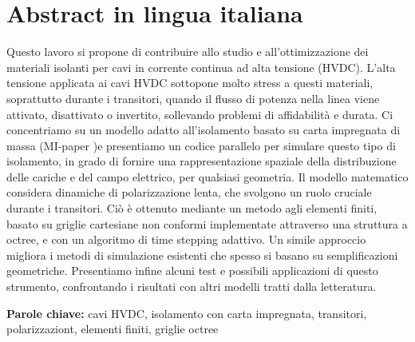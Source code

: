 \documentclass[11pt,a4paper]{article}
\begin{document}
\section*{Abstract in lingua italiana}
Questo lavoro si propone di contribuire allo studio e all'ottimizzazione dei materiali isolanti per cavi in corrente continua ad alta tensione (HVDC). L'alta tensione applicata ai cavi HVDC sottopone molto stress a questi materiali, soprattutto durante i transitori, quando il flusso di potenza nella linea viene attivato, disattivato o invertito, sollevando problemi di affidabilità e durata. Ci concentriamo su un modello adatto all'isolamento basato su carta impregnata di massa (MI-paper )e presentiamo un codice parallelo per simulare questo tipo di isolamento, in grado di fornire una rappresentazione spaziale della distribuzione delle cariche e del campo elettrico, per qualsiasi geometria. Il modello matematico considera dinamiche di polarizzazione lenta, che svolgono un ruolo cruciale durante i transitori. Ciò è ottenuto mediante un metodo agli elementi finiti, basato su griglie cartesiane non conformi implementate attraverso una struttura a octree, e con un algoritmo di time stepping adattivo. Un simile approccio migliora i metodi di simulazione esistenti che spesso si basano su semplificazioni geometriche. Presentiamo infine alcuni test e possibili applicazioni di questo strumento, confrontando i risultati con altri modelli tratti dalla letteratura.
\vspace{15pt}
\begin{tcolorbox}[arc=0pt, boxrule=0pt, colback=bluePoli!60, width=\textwidth, colupper=white]
    \textbf{Parole chiave:} cavi HVDC, isolamento con carta impregnata, transitori, polarizzaziont, elementi finiti, griglie octree 
\end{tcolorbox}


\end{document}
